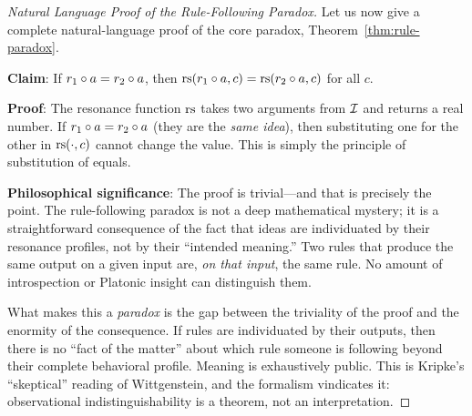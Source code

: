 \begin{proof}[Natural Language Proof of the Rule-Following Paradox]
Let us now give a complete natural-language proof of the core paradox,
Theorem~\ref{thm:rule-paradox}.

\textbf{Claim}: If $r_1 \circ a = r_2 \circ a$, then
$\mathrm{rs}(r_1 \circ a, c) = \mathrm{rs}(r_2 \circ a, c)$ for all $c$.

\textbf{Proof}: The resonance function $\mathrm{rs}$ takes two arguments from
$\mathcal{I}$ and returns a real number. If $r_1 \circ a = r_2 \circ a$
(they are the \emph{same idea}), then substituting one for the other in
$\mathrm{rs}(\cdot, c)$ cannot change the value. This is simply the principle of
substitution of equals.

\textbf{Philosophical significance}: The proof is trivial---and that is
precisely the point. The rule-following paradox is not a deep mathematical
mystery; it is a straightforward consequence of the fact that ideas are
individuated by their resonance profiles, not by their ``intended meaning.''
Two rules that produce the same output on a given input are, \emph{on that
input}, the same rule. No amount of introspection or Platonic insight can
distinguish them.

What makes this a \emph{paradox} is the gap between the triviality of the
proof and the enormity of the consequence. If rules are individuated by their
outputs, then there is no ``fact of the matter'' about which rule someone is
following beyond their complete behavioral profile. Meaning is exhaustively
public. This is Kripke's ``skeptical'' reading of Wittgenstein, and the
formalism vindicates it: observational indistinguishability is a theorem,
not an interpretation.
\end{proof}

